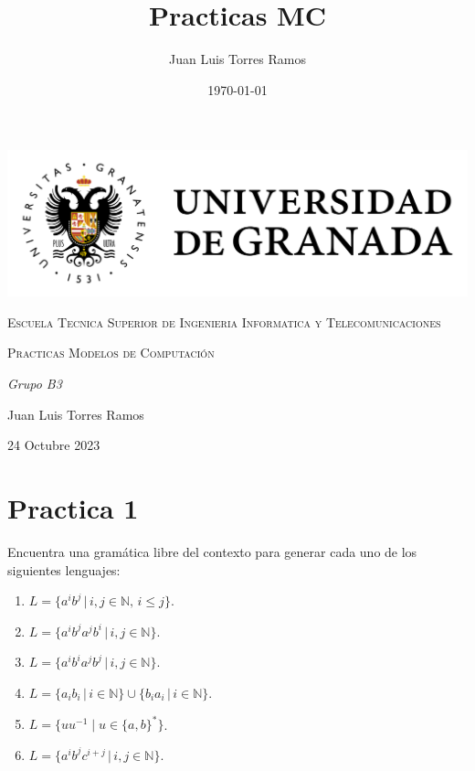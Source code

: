 \documentclass{article}
\title{Practicas MC}
\date{\today}
\author{Juan Luis Torres Ramos}
\begin{document}
        

        \begin{titlepage}
            \centering
            {\includegraphics[width=1\textwidth]{./Imagenes/logo_universidad_de_granada.png}\par}
            \vspace{1cm}
            {\scshape\Large Escuela Tecnica Superior de Ingenieria Informatica y Telecomunicaciones \par}
            \vspace{2.5cm}
            {\scshape\Huge Practicas Modelos de Computación \par}
            \vspace{1cm}
            {\itshape\Large  Grupo B3 \par} 
            \vfill
            {\Large Juan Luis Torres Ramos \par}
            \vspace{0.5cm}
            {\large 24 Octubre 2023 \par}
            \end{titlepage}


        \section*{Practica 1}
        Encuentra una gramática libre del contexto para generar cada uno de los siguientes lenguajes:

        \begin{enumerate}
            \item $L = \{a^i b^j \, | \, i, j \in \mathbb{N}, \, i \leq j\}$.
            \item $L = \{a^i b^j a^j b^i \, | \, i, j \in \mathbb{N}\}$.
            \item $L = \{a^i b^i a^j b^j \, | \, i, j \in \mathbb{N}\}$.
            \item $L = \{a_i b_i \,|\, i \in \mathbb{N}\} \cup \{b_i a_i \,|\, i \in \mathbb{N\}}$.
            \item $L = \{uu^{-1} \mid u \in \{a, b\}^*\}$.
            \item $L = \{a^i b^j c^{i+j} \, | \, i, j \in \mathbb{N}\}$.    
        \end{enumerate}
\end{document}
